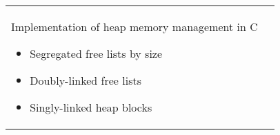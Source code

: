 \documentclass[letterpaper,10pt]{article} %
\begin{document}
\begin{tabular}{ll}
\begin{minipage}[t]{3.5in}
            Implementation of heap memory management in C
            \begin{itemize}
                \item Segregated free lists by size
                \item Doubly-linked free lists
                \item Singly-linked heap blocks
            \end{itemize}
    \end{minipage}
\end{tabular}
\end{document}
